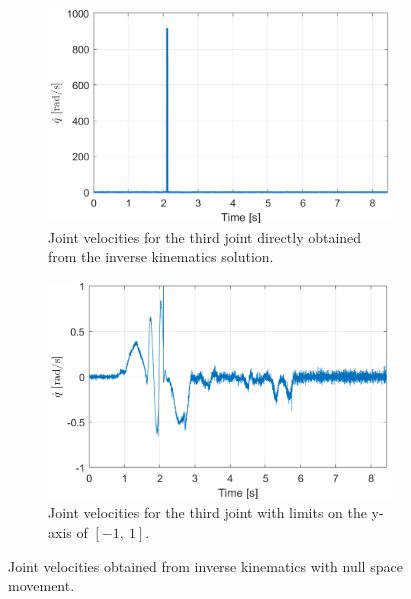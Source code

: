 \documentclass[../main.tex]{subfiles}
\begin{document}
\begin{figure}[H]
    \centering
    \begin{subfigure}[b]{0.48\textwidth}
        \centering
        \includegraphics[width=\textwidth]{figures/linkcollision/joint_3_vel_1.png}
        \caption{Joint velocities for the third joint directly obtained from the inverse kinematics solution.}
        \label{fig:link:problem:joint3:1}
    \end{subfigure}
    \hfill
    \begin{subfigure}[b]{0.48\textwidth}
        \centering
        \includegraphics[width=\textwidth]{figures/linkcollision/joint_3_vel_2.png}
        \caption{Joint velocities for the third joint with limits on the y-axis of $[-1,\ 1]$.}
        \label{fig:link:problem:joint3:2}
    \end{subfigure}
    \caption{Joint velocities obtained from inverse kinematics with null space movement.}
    \label{fig:link:problem:joint3}
\end{figure}
\end{document}
